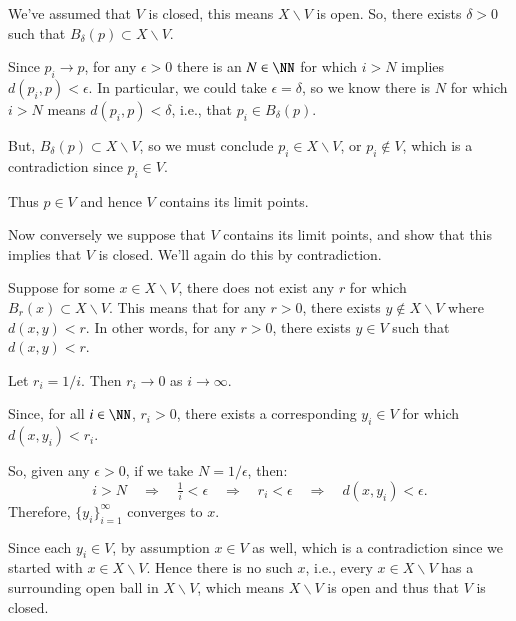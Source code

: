 \documentclass{homework}
\begin{document}
We've assumed that $V$ is closed, this means $X\backslash V$ is open.
So, there exists $\delta>0$ such that
$B_\delta(p)\subset X\backslash V$.

Since $p_i\rightarrow p$, for any $\epsilon>0$ there is an $N\in\NN$
for which $i>N$ implies $d(p_i,p)<\epsilon$.  In particular, we could
take $\epsilon=\delta$, so we know there is $N$ for which $i>N$
means $d(p_i,p)<\delta$, i.e., that $p_i\in B_\delta(p)$.

But, $B_\delta(p)\subset X\backslash V$, so we must conclude
$p_i \in X\backslash V$, or $p_i\not\in V$, which is a contradiction
since $p_i\in V$.

Thus $p\in V$ and hence $V$ contains its limit points.

Now conversely we suppose that $V$ contains its limit points, and
show that this implies that $V$ is closed.  We'll again do this
by contradiction.

Suppose for some $x\in X\backslash V$, there does not exist any $r$
for which $B_r(x)\subset X\backslash V$.  This means that for any $r>0$,
there exists $y\not\in X\backslash V$ where $d(x,y)<r$.  In other
words, for any $r>0$, there exists $y\in V$ such that $d(x,y)<r$.

Let $r_i=1/i$.  Then $r_i\rightarrow 0$ as $i\rightarrow\infty$.

Since, for all $i\in\NN$, $r_i>0$, there exists a corresponding
$y_i\in V$ for which $d(x,y_i)<r_i$.

So, given any $\epsilon>0$, if we take $N=1/\epsilon$, then:
$$ i>N \quad\Rightarrow\quad \tfrac{1}{i} < \epsilon
 \quad\Rightarrow\quad r_i<\epsilon \quad\Rightarrow\quad d(x,y_i)<\epsilon. $$
Therefore, $\{y_i\}_{i=1}^\infty$ converges to $x$.

Since each $y_i\in V$, by assumption $x\in V$ as well, which is a
contradiction since we started with $x\in X\backslash V$.  Hence there
is no such $x$, i.e., every $x\in X\backslash V$ has a
surrounding open ball
in $X\backslash V$, which means $X\backslash V$ is open and thus
that $V$ is closed.

\hrulefill
\end{document}
